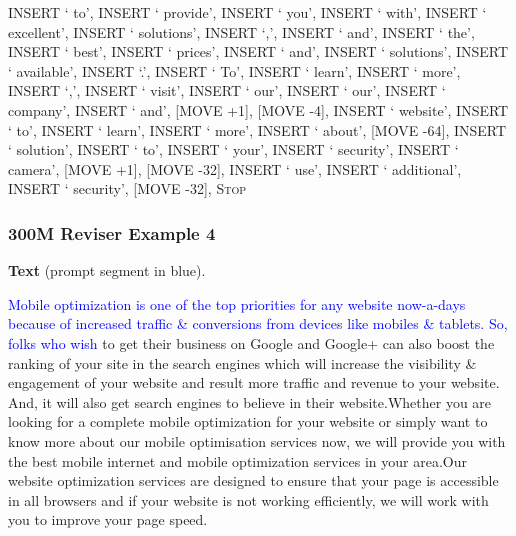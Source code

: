 \documentclass[11pt]{article}
\DeclareRobustCommand{\Stop}{\ifmmode\text{\textsc{Stop}}\else\textsc{Stop}\fi}
\begin{document}
{INSERT ` to', INSERT ` provide', INSERT ` you', INSERT ` with', INSERT ` excellent', INSERT ` solutions', INSERT `,', INSERT ` and', INSERT ` the', INSERT ` best', INSERT ` prices', INSERT ` and', INSERT ` solutions', INSERT ` available', INSERT `.', INSERT ` To', INSERT ` learn', INSERT ` more', INSERT `,', INSERT ` visit', INSERT ` our', INSERT ` our', INSERT ` company', INSERT ` and', [MOVE +1], [MOVE -4], INSERT ` website', INSERT ` to', INSERT ` learn', INSERT ` more', INSERT ` about', [MOVE -64], INSERT ` solution', INSERT ` to', INSERT ` your', INSERT ` security', INSERT ` camera', [MOVE +1], [MOVE -32], INSERT ` use', INSERT ` additional', INSERT ` security', [MOVE -32], \Stop\par
}
\vspace{0.8em}
\subsubsection*{300M Reviser Example 4}
\textbf{Text} (prompt segment in blue).\par
\ttfamily\small \textcolor{blue}{Mobile optimization is one of the top priorities for any website now-a-days because of increased traffic \& conversions from devices like mobiles \& tablets. So, folks who wish} to get their business on Google and Google+ can also boost the ranking of your site in the search engines which will increase the visibility \& engagement of your website and result more traffic and revenue to your website. And, it will also get search engines to believe in their website.\newline Whether you are looking for a complete mobile optimization for your website or simply want to know more about our mobile optimisation services now, we will provide you with the best mobile internet and mobile optimization services in your area.\newline Our website optimization services are designed to ensure that your page is accessible in all browsers and if your website is not working efficiently, we will work with you to improve your page speed.
\end{document}
